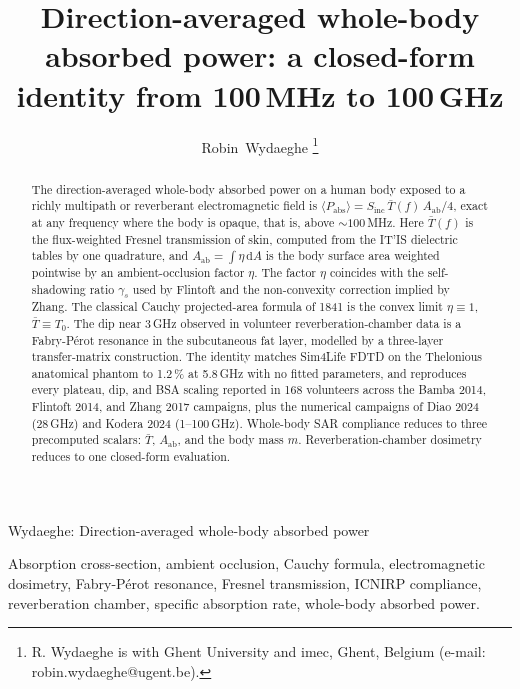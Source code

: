 \documentclass[journal,twocolumn,10pt]{IEEEtran}
\theoremstyle{plain}
\theoremstyle{remark}
\newcommand{\Sinc}{S_{\mathrm{inc}}}
\newcommand{\Aab}{A_{\mathrm{ab}}}
\newcommand{\Tbar}{\bar{T}}
\newcommand{\diff}{\mathrm{d}}
\begin{document}
\title{Direction-averaged whole-body absorbed power: a closed-form identity from 100\,MHz to 100\,GHz}

\author{Robin~Wydaeghe%
  \thanks{R. Wydaeghe is with Ghent University and imec, Ghent, Belgium
  (e-mail: robin.wydaeghe@ugent.be).}}

%
{Wydaeghe: Direction-averaged whole-body absorbed power}

\maketitle

\begin{abstract}
The direction-averaged whole-body absorbed power on a human body
exposed to a richly multipath or reverberant electromagnetic field is
$\langle P_{\mathrm{abs}} \rangle = \Sinc\,\Tbar(f)\,\Aab/4$, exact at
any frequency where the body is opaque, that is, above
$\sim 100\,$MHz. Here $\Tbar(f)$ is the flux-weighted Fresnel
transmission of skin, computed from the IT'IS dielectric tables by one
quadrature, and $\Aab = \int \eta\,\diff A$ is the body surface area
weighted pointwise by an ambient-occlusion factor $\eta$. The factor
$\eta$ coincides with the self-shadowing ratio $\gamma_s$ used by
Flintoft and the non-convexity correction implied by Zhang. The
classical Cauchy projected-area formula of 1841 is the convex limit
$\eta \equiv 1$, $\Tbar \equiv T_0$. The dip near 3\,GHz observed in
volunteer reverberation-chamber data is a Fabry-P\'erot resonance in
the subcutaneous fat layer, modelled by a three-layer transfer-matrix
construction. The identity matches Sim4Life FDTD on the Thelonious anatomical
phantom to 1.2\,\% at 5.8\,GHz with no fitted parameters, and
reproduces every plateau, dip, and BSA scaling reported in 168
volunteers across the Bamba 2014, Flintoft 2014, and Zhang 2017
campaigns, plus the numerical campaigns of Diao 2024 (28\,GHz) and
Kodera 2024 (1--100\,GHz). Whole-body SAR compliance reduces to three
precomputed scalars: $\Tbar$, $\Aab$, and the body mass $m$.
Reverberation-chamber dosimetry reduces to one closed-form evaluation.
\end{abstract}

\begin{IEEEkeywords}
Absorption cross-section, ambient occlusion, Cauchy formula,
electromagnetic dosimetry, Fabry-P\'erot resonance, Fresnel
transmission, ICNIRP compliance, reverberation chamber, specific
absorption rate, whole-body absorbed power.
\end{IEEEkeywords}
\end{document}
